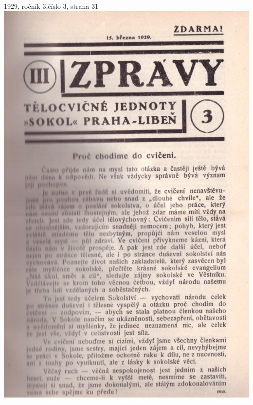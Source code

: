 \documentclass[11pt]{article}
\begin{document}
1929, ročník 3,číslo 3, strana 31 \\
\includegraphics[width=\imagewidth]{original/1929/Skener_20250318 (9).jpg}
\end{document}
